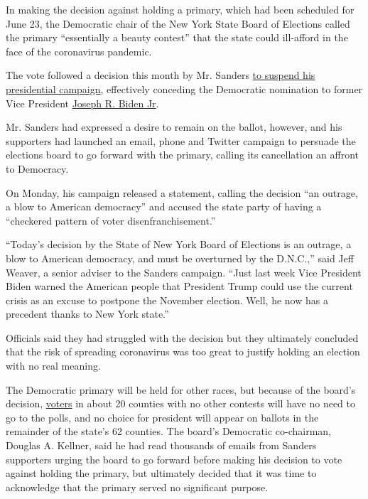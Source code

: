In making the decision against holding a primary, which had been
scheduled for June 23, the Democratic chair of the New York State Board
of Elections called the primary ``essentially a beauty contest'' that
the state could ill-afford in the face of the coronavirus pandemic.

The vote followed a decision this month by Mr. Sanders
\href{https://slack-redir.net/link?url=https\%3A\%2F\%2Fwww.nytimes3xbfgragh.onion\%2F2020\%2F04\%2F08\%2Fus\%2Fpolitics\%2Fbernie-sanders-drops-out.html}{to
suspend his presidential campaign}, effectively conceding the Democratic
nomination to former Vice President
\href{https://slack-redir.net/link?url=https\%3A\%2F\%2Fwww.nytimes3xbfgragh.onion\%2Finteractive\%2F2020\%2Fus\%2Felections\%2Fjoe-biden.html}{Joseph
R. Biden Jr}.

Mr. Sanders had expressed a desire to remain on the ballot, however, and
his supporters had launched an email, phone and Twitter campaign to
persuade the elections board to go forward with the primary, calling its
cancellation an affront to Democracy.

On Monday, his campaign released a statement, calling the decision ``an
outrage, a blow to American democracy'' and accused the state party of
having a ``checkered pattern of voter disenfranchisement.''

``Today's decision by the State of New York Board of Elections is an
outrage, a blow to American democracy, and must be overturned by the
D.N.C.,'' said Jeff Weaver, a senior adviser to the Sanders campaign.
``Just last week Vice President Biden warned the American people that
President Trump could use the current crisis as an excuse to postpone
the November election. Well, he now has a precedent thanks to New York
state.''

Officials said they had struggled with the decision but they ultimately
concluded that the risk of spreading coronavirus was too great to
justify holding an election with no real meaning.

The Democratic primary will be held for other races, but because of the
board's decision,
\href{https://www.nytimes3xbfgragh.onion/2020/05/29/us/politics/trump-coronavirus-polls.html}{voters}
in about 20 counties with no other contests will have no need to go to
the polls, and no choice for president will appear on ballots in the
remainder of the state's 62 counties. The board's Democratic
co-chairman, Douglas A. Kellner, said he had read thousands of emails
from Sanders supporters urging the board to go forward before making his
decision to vote against holding the primary, but ultimately decided
that it was time to acknowledge that the primary served no significant
purpose.

